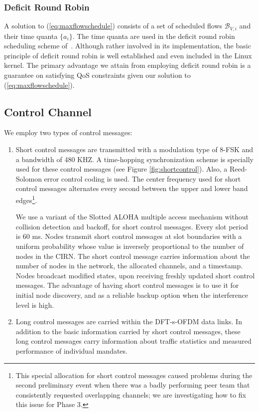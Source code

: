 \documentclass[11pt]{article}
\begin{document}
\subsubsection{Deficit Round Robin}
A solution to (\ref{eq:maxflowschedule}) consists of a set of scheduled flows \(\mathcal{B}_{V,i}\) and their time quanta \(\{a_i\}\).  The time quanta are used in the deficit round robin scheduling scheme of~\cite{502236}.  Although rather involved in its implementation, the basic principle of deficit round robin is well established and even included in the Linux kernel.  The primary advantage we attain from employing deficit round robin is a guarantee on satisfying QoS constraints given our solution to (\ref{eq:maxflowschedule}).


\subsection{Control Channel}\label{sec:control}
We employ two types of control messages:
\begin{enumerate}
    \item Short control messages are transmitted with a modulation type of 8-FSK and a bandwidth of 480 KHZ. A time-hopping synchronization scheme is specially used for these control messages (see Figure \ref{fig:shortcontrol}). Also, a Reed-Solomon error control coding is used. The center frequency used for short control messages alternates every second between the upper and lower band edges\footnote{This special allocation for short control messages caused problems during the second preliminary event when there was a badly performing peer team that consistently requested overlapping channels; we are investigating how to fix this issue for Phase 3.}.
    
    We use a variant of the Slotted ALOHA multiple access mechanism without collision detection and backoff, for short control messages. Every slot period is 60 ms. Nodes transmit short control messages at slot boundaries with a uniform probability whose value is inversely proportional to the number of nodes in the CIRN. The short control message carries information about the number of nodes in the network, the allocated channels, and a timestamp. Nodes broadcast modified states, upon receiving freshly updated short control messages. The advantage of having short control messages is to use it for initial node discovery, and as a reliable backup option when the interference level is high.
    
    \item Long control messages are carried within the DFT-s-OFDM data links. In addition to the basic information carried by short control messages, these long control messages carry information about traffic statistics and measured performance of individual mandates.
\end{enumerate}
\end{document}
